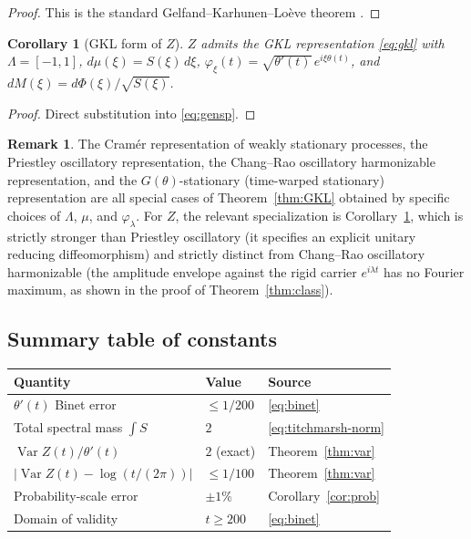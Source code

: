 \documentclass[11pt]{amsart}
\newtheorem{corollary}[theorem]{Corollary}
\theoremstyle{definition}
\newtheorem{remark}[theorem]{Remark}
\DeclareMathOperator{\Var}{Var}
\begin{document}
\begin{proof}
This is the standard Gelfand--Karhunen--Lo\`eve theorem
\cite{Karhunen1947,Loeve1978}.
\end{proof}

\begin{corollary}[GKL form of $Z$]\label{cor:gklZ}
$Z$ admits the GKL representation \eqref{eq:gkl} with $\Lambda=[-1,1]$,
$d\mu(\xi)=S(\xi)\,d\xi$,
$\varphi_{\xi}(t)=\sqrt{\theta'(t)}\,e^{i\xi\theta(t)}$, and
$dM(\xi)=d\Phi(\xi)/\sqrt{S(\xi)}$.
\end{corollary}

\begin{proof}
Direct substitution into \eqref{eq:gensp}.
\end{proof}

\begin{remark}
The Cram\'er representation of weakly stationary processes, the Priestley
oscillatory representation, the Chang--Rao oscillatory harmonizable
representation, and the $G(\theta)$-stationary (time-warped stationary)
representation are all special cases of Theorem~\ref{thm:GKL} obtained
by specific choices of $\Lambda$, $\mu$, and $\varphi_{\lambda}$. For
$Z$, the relevant specialization is Corollary~\ref{cor:gklZ}, which is
strictly stronger than Priestley oscillatory (it specifies an explicit
unitary reducing diffeomorphism) and strictly distinct from Chang--Rao
oscillatory harmonizable (the amplitude envelope against the rigid
carrier $e^{i\lambda t}$ has no Fourier maximum, as shown in the proof
of Theorem~\ref{thm:class}).
\end{remark}

\subsection{Summary table of constants}

\begin{center}
\begin{tabular}{lll}
\hline
Quantity & Value & Source \\
\hline
$\theta'(t)$ Binet error & $\le 1/200$ & \eqref{eq:binet} \\
Total spectral mass $\int S$ & $2$ & \eqref{eq:titchmarsh-norm} \\
$\Var Z(t)/\theta'(t)$ & $2$ (exact) & Theorem~\ref{thm:var} \\
$|\Var Z(t)-\log(t/(2\pi))|$ & $\le 1/100$ & Theorem~\ref{thm:var} \\
Probability-scale error & $\pm 1\%$ & Corollary~\ref{cor:prob} \\
Domain of validity & $t\ge 200$ & \eqref{eq:binet} \\
\hline
\end{tabular}
\end{center}
\end{document}
